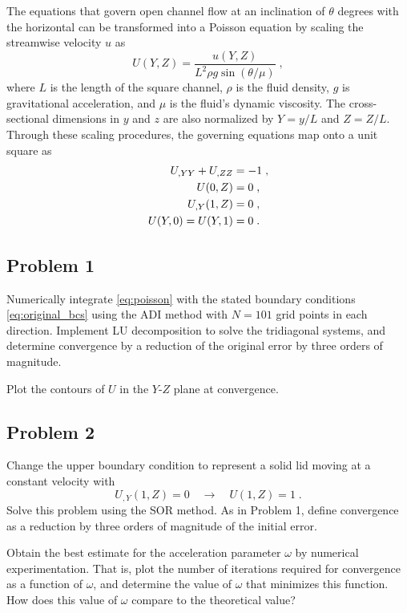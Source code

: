 \documentclass[11pt]{article}
\begin{document}
The equations that govern open channel flow at an inclination of $\theta$ degrees with the horizontal can be transformed into a Poisson equation by scaling the streamwise velocity $u$ as
\begin{equation}
U(Y,Z) = \frac{u(Y,Z)}{L^2 \rho g \sin(\theta / \mu)}
\;,
\end{equation}
where $L$ is the length of the square channel, $\rho$ is the fluid density, $g$ is gravitational acceleration, and $\mu$ is the fluid's dynamic viscosity. The cross-sectional dimensions in $y$ and $z$ are also normalized by $Y = y/L$ and $Z = Z/L$. Through these scaling procedures, the governing equations map onto a unit square as
\begin{align}
U_{,YY} + U_{,ZZ} &= -1
\;, \label{eq:poisson} \\
U(0,Z) &= 0
\;, \notag\\
U_{,Y}(1,Z) &= 0
\;, \notag\\
U(Y,0) = U(Y,1) &= 0
\;.
\label{eq:original_bcs}
\end{align}

\subsection{Problem 1}

Numerically integrate \eqref{eq:poisson} with the stated boundary conditions \eqref{eq:original_bcs} using the ADI method with $N = 101$ grid points in each direction. Implement LU decomposition to solve the tridiagonal systems, and determine convergence by a reduction of the original error by three orders of magnitude.

Plot the contours of $U$ in the $Y$-$Z$ plane at convergence.

\subsection{Problem 2}

Change the upper boundary condition to represent a solid lid moving at a constant velocity with
\begin{equation}
U_{,Y}(1,Z) = 0 \quad\longrightarrow\quad U(1,Z) = 1
\;.
\end{equation}
Solve this problem using the SOR method. As in Problem 1, define convergence as a reduction by three orders of magnitude of the initial error.

Obtain the best estimate for the acceleration parameter $\omega$ by numerical experimentation. That is, plot the number of iterations required for convergence as a function of $\omega$, and determine the value of $\omega$ that minimizes this function. How does this value of $\omega$ compare to the theoretical value?
\end{document}
